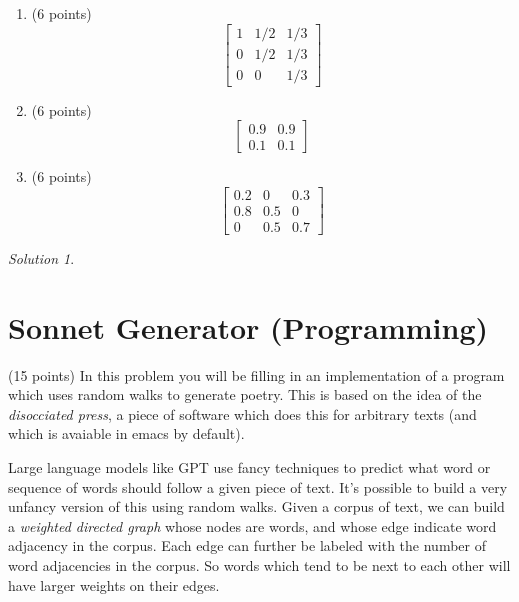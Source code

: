 \documentclass{article}
\theoremstyle{remark}
\newtheorem*{solution}{Solution}
\begin{document}
\begin{enumerate}
\item (6 points)
  \begin{displaymath}
    \begin{bmatrix}
      1 & 1/2 & 1/3 \\
      0 & 1/2 & 1/3 \\
      0 & 0 & 1/3
    \end{bmatrix}
  \end{displaymath}
\item (6 points)
  \begin{displaymath}
    \begin{bmatrix}
      0.9 & 0.9 \\
      0.1 & 0.1
    \end{bmatrix}
  \end{displaymath}
\item (6 points)
  \begin{displaymath}
    \begin{bmatrix}
      0.2 & 0 & 0.3 \\
      0.8 & 0.5 & 0 \\
      0 & 0.5 & 0.7
    \end{bmatrix}
  \end{displaymath}
\end{enumerate}
\medskip

\begin{solution}
\end{solution}

\vfill
\pagebreak
\section{Sonnet Generator (Programming)}

(15 points) In this problem you will be filling in an implementation of a program which uses random walks to generate poetry.
This is based on the idea of the \textit{disocciated press}, a piece of software which does this for arbitrary texts (and which is avaiable in emacs by default).

Large language models like GPT use fancy techniques to predict what word or sequence of words should follow a given piece of text.
It's possible to build a very unfancy version of this using random walks.
Given a corpus of text, we can build a \textit{weighted directed graph} whose nodes are words, and whose edge indicate word adjacency in the corpus.
Each edge can further be labeled with the number of word adjacencies in the corpus.
So words which tend to be next to each other will have larger weights on their edges.
\end{document}
